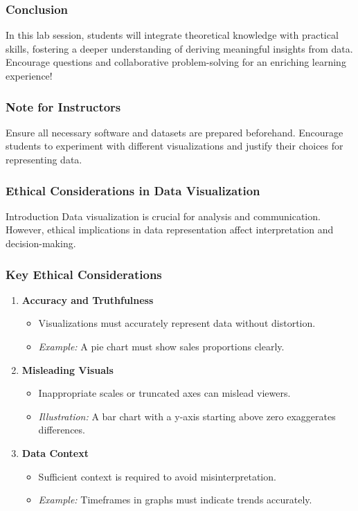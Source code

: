 \documentclass[aspectratio=169]{beamer}
\begin{document}
\begin{frame}
    \frametitle{Conclusion}
    In this lab session, students will integrate theoretical knowledge with practical skills, fostering a deeper understanding of deriving meaningful insights from data. Encourage questions and collaborative problem-solving for an enriching learning experience!
\end{frame}

\begin{frame}
    \frametitle{Note for Instructors}
    Ensure all necessary software and datasets are prepared beforehand. Encourage students to experiment with different visualizations and justify their choices for representing data.
\end{frame}

\begin{frame}[fragile]
    \frametitle{Ethical Considerations in Data Visualization}
    \begin{block}{Introduction}
        Data visualization is crucial for analysis and communication. However, ethical implications in data representation affect interpretation and decision-making.
    \end{block}
\end{frame}

\begin{frame}[fragile]
    \frametitle{Key Ethical Considerations}
    \begin{enumerate}
        \item \textbf{Accuracy and Truthfulness}
        \begin{itemize}
            \item Visualizations must accurately represent data without distortion.
            \item \textit{Example:} A pie chart must show sales proportions clearly.
        \end{itemize}
        
        \item \textbf{Misleading Visuals}
        \begin{itemize}
            \item Inappropriate scales or truncated axes can mislead viewers.
            \item \textit{Illustration:} A bar chart with a y-axis starting above zero exaggerates differences.
        \end{itemize}
        
        \item \textbf{Data Context}
        \begin{itemize}
            \item Sufficient context is required to avoid misinterpretation.
            \item \textit{Example:} Timeframes in graphs must indicate trends accurately.
        \end{itemize}
    \end{enumerate}
\end{frame}
\end{document}
